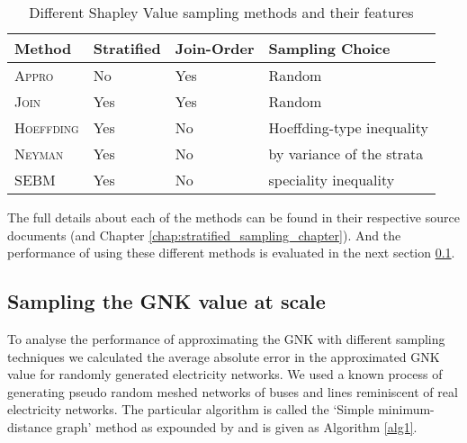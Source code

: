 \begin{table}[]
\centering
\begin{tabular}{|l|l|l|l|}
\hline
Method & Stratified & Join-Order & Sampling Choice \\ \hline
\textsc{Appro} & No & Yes & Random\\
\textsc{Join} & Yes & Yes & Random\\
\textsc{Hoeffding} & Yes & No & Hoeffding-type inequality \\
\textsc{Neyman} & Yes & No & by variance of the strata \\
\textsc{SEBM} & Yes & No & speciality inequality\\ \hline
\end{tabular}
\caption{Different Shapley Value sampling methods and their features}
\label{table:stratified_sampling_methods}
\end{table}

The full details about each of the methods can be found in their respective source documents \citep{CASTRO2017180,2013arXiv1306.4265M,DBLP:journals/cor/CastroGT09} (and Chapter \ref{chap:stratified_sampling_chapter}).
And the performance of using these different methods is evaluated in the next section \ref{section:performance}.

\subsection{Sampling the GNK value at scale}\label{section:performance}

To analyse the performance of approximating the GNK with different sampling techniques we calculated the average absolute error in the approximated GNK value for randomly generated electricity networks.
We used a known process of generating pseudo random meshed networks of buses and lines reminiscent of real electricity networks. The particular algorithm is called the `Simple minimum-distance graph' method as expounded by \cite{hines1} and is given as Algorithm \ref{alg1}.

